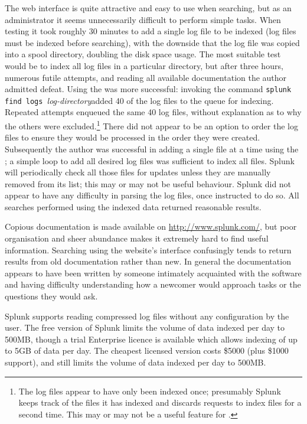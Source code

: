 The web interface is quite attractive and easy to use when searching, but
as an administrator it seems unnecessarily difficult to perform simple
tasks.  When testing it took roughly 30 minutes to add a single log file to
be indexed (log files must be indexed before searching), with the downside
that the log file was copied into a spool directory, doubling the disk
space usage.  The most suitable test would be to index all log files in a
particular directory, but after three hours, numerous futile attempts, and
reading all available documentation the author admitted defeat.  Using the
\CLI{} was more successful: invoking the command \newline \tab{}
\texttt{splunk find logs }\textit{log-directory\/}\newline added 40 of the
\numberOFlogFILES{} log files to the queue for indexing.  Repeated attempts
enqueued the same 40 log files, without explanation as to why the others
were excluded.\footnote{The log files appear to have only been indexed
once; presumably Splunk keeps track of the files it has indexed and
discards requests to index files for a second time.  This may or may not be
a useful feature for \parsername{}.} There did not appear to be an option
to order the log files to ensure they would be processed in the order they
were created.  Subsequently the author was successful in adding a single
file at a time using the \CLI{}; a simple loop to add all desired log files
was sufficient to index all files.  Splunk will periodically check all
those files for updates unless they are manually removed from its list;
this may or may not be useful behaviour.  Splunk did not appear to have any
difficulty in parsing the log files, once instructed to do so.  All
searches performed using the indexed data returned reasonable results.

Copious documentation is made available on \url{http://www.splunk.com/},
but poor organisation and sheer abundance makes it extremely hard to find
useful information.  Searching using the website's interface confusingly
tends to return results from old documentation rather than new.  In
general the documentation appears to have been written by someone
intimately acquainted with the software and having difficulty understanding
how a newcomer would approach tasks or the questions they would ask.

Splunk supports reading compressed log files without any configuration by
the user.  The free version of Splunk limits the volume of data indexed per
day to 500MB, though a trial Enterprise licence is available which allows
indexing of up to 5GB of data per day.  The cheapest licensed version costs
\$5000 (plus \$1000 support), and still limits the volume of data indexed
per day to 500MB.

